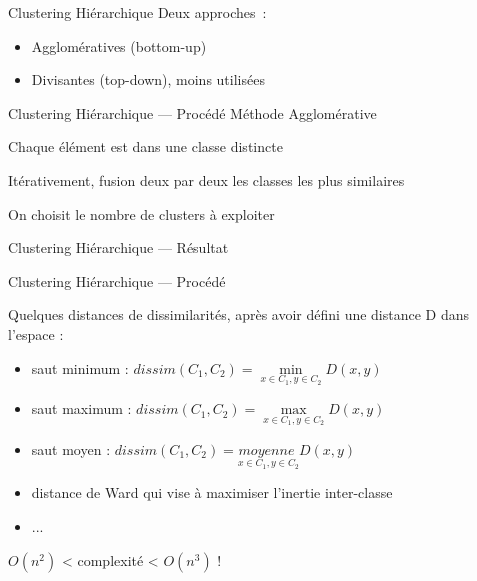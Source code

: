 
\begin{frame}{Clustering Hiérarchique}
  Deux approches~:

  \begin{itemize}[<+->]
    \item Agglomératives (bottom-up)
    \item Divisantes (top-down), moins utilisées
  \end{itemize}
\end{frame}

\begin{frame}{Clustering Hiérarchique --- Procédé}
  Méthode Agglomérative

  \begin{description}[<+->]
    \item[Initialisation] Chaque élément est dans une classe distincte
    \item[Aggrégation] Itérativement, fusion deux par deux les classes les plus similaires
    \item[Exploitation] On choisit le nombre de clusters à exploiter
  \end{description}
\end{frame}

\begin{frame}{Clustering Hiérarchique --- Résultat}
\end{frame}

\begin{frame}{Clustering Hiérarchique --- Procédé}

  Quelques distances de dissimilarités, après avoir défini une distance D dans l'espace :

  \begin{itemize}[<+->]
  \item saut minimum : $dissim(C_1,C_2) = \underset{x \in C_1,y \in C_2}{\min}{D(x,y)}$
  \item saut maximum : $dissim(C_1,C_2) = \underset{x \in C_1,y \in C_2}{\max}{D(x,y)}$
  \item saut moyen : $dissim(C_1,C_2) = \underset{x \in C_1,y \in C_2}{moyenne\;}{D(x,y)}$
  \item distance de Ward qui vise à maximiser l'inertie inter-classe
  \item ...
  \end{itemize}

  $O(n^2)$ < complexité < $O(n^3)$ !
\end{frame}
